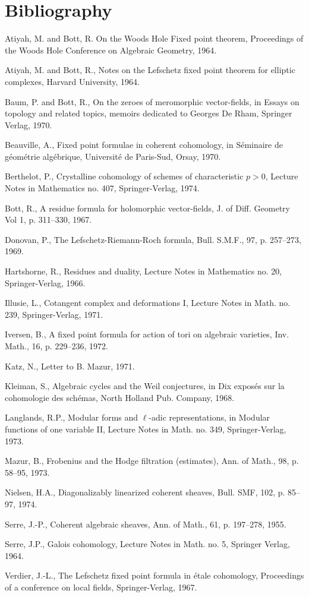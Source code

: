 \section*{Bibliography}
\begin{enumerate}[label={[\arabic*]},leftmargin=3.5em]
\item Atiyah, M. and Bott, R. On the Woods Hole Fixed point theorem, Proceedings of the Woods Hole Conference on Algebraic Geometry, 1964.
\item Atiyah, M. and Bott, R., Notes on the Lefschetz fixed point theorem for elliptic complexes, Harvard University, 1964.
\item Baum, P. and Bott, R., On the zeroes of meromorphic vector-fields, in Essays on topology and related topics, memoirs dedicated to Georges De Rham, Springer Verlag, 1970.
\item Beauville, A., Fixed point formulae in coherent cohomology, in Séminaire de géométrie algébrique, Université de Paris-Sud, Orsay, 1970.
\item Berthelot, P., Crystalline cohomology of schemes of characteristic $p>0$, Lecture Notes in Mathematics no. 407, Springer-Verlag, 1974.
\item Bott, R., A residue formula for holomorphic vector-fields, J. of Diff. Geometry Vol 1, p. 311--330, 1967.
\item Donovan, P., The Lefschetz-Riemann-Roch formula, Bull. S.M.F., 97, p. 257--273, 1969.
\item Hartshorne, R., Residues and duality, Lecture Notes in Mathematics no. 20, Springer-Verlag, 1966.
\item Illusie, L., Cotangent complex and deformations I, Lecture Notes in Math. no. 239, Springer-Verlag, 1971.
\item Iversen, B., A fixed point formula for action of tori on algebraic varieties, Inv. Math., 16, p. 229--236, 1972.
\item Katz, N., Letter to B. Mazur, 1971.
\item Kleiman, S., Algebraic cycles and the Weil conjectures, in Dix exposés sur la cohomologie des schémas, North Holland Pub. Company, 1968.
\item Langlands, R.P., Modular forms and $\ell$-adic representations, in Modular functions of one variable II, Lecture Notes in Math. no. 349, Springer-Verlag, 1973.
\item Mazur, B., Frobenius and the Hodge filtration (estimates), Ann. of Math., 98, p. 58--95, 1973.
\item Nielsen, H.A., Diagonalizably linearized coherent sheaves, Bull. SMF, 102, p. 85--97, 1974.
\item Serre, J.-P., Coherent algebraic sheaves, Ann. of Math., 61, p. 197--278, 1955.
\item Serre, J.P., Galois cohomology, Lecture Notes in Math. no. 5, Springer Verlag, 1964.
\item Verdier, J.-L., The Lefschetz fixed point formula in étale cohomology, Proceedings of a conference on local fields, Springer-Verlag, 1967.
\end{enumerate}

